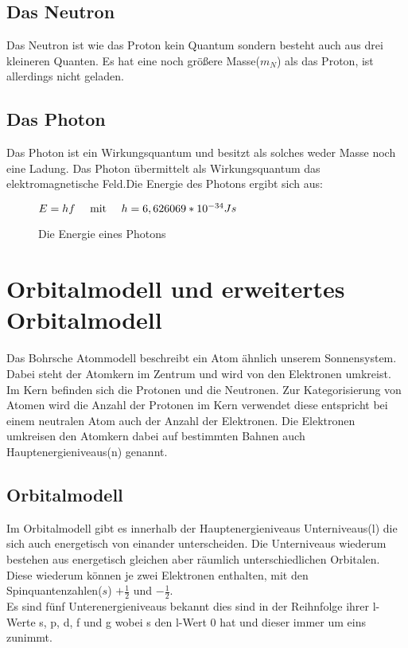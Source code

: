 \documentclass[11pt,a4paper,oneside]{report}
\begin{document}
\subsection{Das Neutron}
Das Neutron ist wie das Proton kein Quantum sondern besteht auch aus drei kleineren Quanten. Es hat eine noch größere Masse($m_N$) als das Proton, ist allerdings nicht geladen.

\subsection{Das Photon}
Das Photon ist ein Wirkungsquantum und besitzt als solches weder Masse noch eine Ladung. Das Photon übermittelt als Wirkungsquantum das elektromagnetische Feld.Die Energie des Photons ergibt sich aus: 

\begin{figure}[h]
\centering
$E=hf \text{\hspace{1em} mit \hspace{1em}} h=6,626069*10^{-34}Js$
\caption{Die Energie eines Photons\cite[S. 421]{stroppe08}}
\end{figure}

\section{Orbitalmodell und erweitertes Orbitalmodell}
Das Bohrsche Atommodell beschreibt ein Atom ähnlich unserem Sonnensystem. Dabei steht der Atomkern im Zentrum und wird von den Elektronen umkreist. Im Kern befinden sich die Protonen und die Neutronen. Zur Kategorisierung von Atomen wird die Anzahl der Protonen im Kern verwendet diese entspricht bei einem neutralen Atom auch der Anzahl der Elektronen. Die Elektronen umkreisen den Atomkern dabei auf bestimmten Bahnen auch Hauptenergieniveaus(n) genannt\cite{hefterCh}.

\subsection{Orbitalmodell}
Im Orbitalmodell gibt es innerhalb der Hauptenergieniveaus Unterniveaus(l) die sich auch energetisch von einander unterscheiden. Die Unterniveaus wiederum bestehen aus energetisch gleichen aber räumlich unterschiedlichen Orbitalen. Diese wiederum können je zwei Elektronen enthalten, mit den Spinquantenzahlen($s$) $+\frac{1}{2}$ und $-\frac{1}{2}$\cite{hefterCh}.
\\
Es sind fünf Unterenergieniveaus bekannt dies sind in der Reihnfolge ihrer l-Werte s, p, d, f und g wobei s den l-Wert 0 hat und dieser immer um eins zunimmt.
\end{document}
